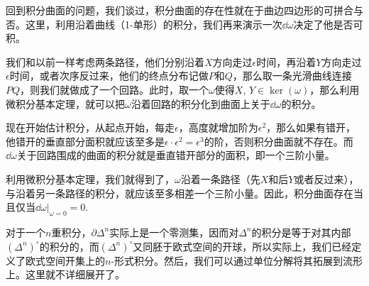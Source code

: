 \para 回到积分曲面的问题，我们谈过，积分曲面的存在性就在于曲边四边形的可拼合与否。这里，利用沿着曲线（1-单形）的积分，我们再来演示一次$\dd\omega$决定了他是否可积。

我们和以前一样考虑两条路径，他们分别沿着$X$方向走过$\epsilon$时间，再沿着$Y$方向走过$\epsilon$时间，或者次序反过来，他们的终点分布记做$P$和$Q$，那么取一条光滑曲线连接$PQ$，则我们就做成了一个回路。此时，取一个$\omega$使得$X$, $Y\in \ker(\omega)$，那么利用微积分基本定理，就可以把$\omega$沿着回路的积分化到曲面上关于$\dd \omega$的积分。

现在开始估计积分，从起点开始，每走$\epsilon$，高度就增加阶为$\epsilon^2$，那么如果有错开，他错开的垂直部分面积就应该至多是$\epsilon\cdot \epsilon^2=\epsilon^3$的阶，否则积分曲面就不存在。而$\dd \omega$关于回路围成的曲面的积分就是垂直错开部分的面积，即一个三阶小量。

利用微积分基本定理，我们就得到了，$\omega$沿着一条路径（先$X$和后$Y$或者反过来），与沿着另一条路径的积分，就应该至多相差一个三阶小量。因此，积分曲面存在当且仅当$\dd \omega|_{\omega=0}=0$.

\para 对于一个$n$重积分，$\partial\Delta^n$实际上是一个零测集，因而对$\Delta^n$的积分是等于对其内部$(\Delta^n)^\circ$的积分的，而$(\Delta^n)^\circ$又同胚于欧式空间的开球，所以实际上，我们已经定义了欧式空间开集上的$n$-形式积分。然后，我们可以通过单位分解将其拓展到流形上。这里就不详细展开了。